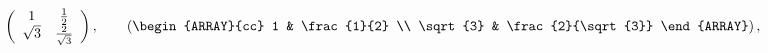 \[
  \left(\begin{array}{cc}
    1        & \frac{1}{2} \\
        \sqrt{3} & \frac{2}{\sqrt{3}}
  \end{array}\right), \qquad
  \left(\begin{ARRAY}{cc}
    1        & \frac{1}{2} \\
        \sqrt{3} & \frac{2}{\sqrt{3}}
  \end{ARRAY}\right),
\]

